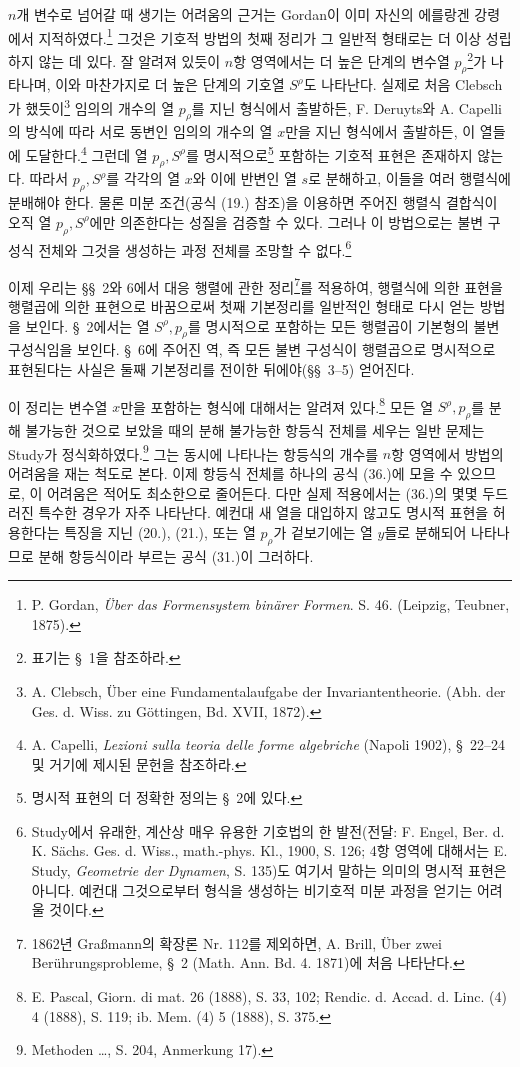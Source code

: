 $n$개 변수로 넘어갈 때 생기는 어려움의 근거는 Gordan이 이미 자신의 에를랑겐 강령에서 지적하였다.\footnote{P. Gordan, \emph{Über das Formensystem binärer Formen}. S. 46. (Leipzig, Teubner, 1875).} 그것은 기호적 방법의 첫째 정리가 그 일반적 형태로는 더 이상 성립하지 않는 데 있다. 잘 알려져 있듯이 $n$항 영역에서는 더 높은 단계의 변수열 $p_\rho$\footnote{표기는 \S\ 1을 참조하라.}가 나타나며, 이와 마찬가지로 더 높은 단계의 기호열 $S^\rho$도 나타난다. 실제로 처음 Clebsch가 했듯이\footnote{A. Clebsch, Über eine Fundamentalaufgabe der Invariantentheorie. (Abh. der Ges. d. Wiss. zu Göttingen, Bd. XVII, 1872).} 임의의 개수의 열 $p_\rho$를 지닌 형식에서 출발하든, F. Deruyts와 A. Capelli의 방식에 따라 서로 동변인 임의의 개수의 열 $x$만을 지닌 형식에서 출발하든, 이 열들에 도달한다.\footnote{A. Capelli, \emph{Lezioni sulla teoria delle forme algebriche} (Napoli 1902), \S\ 22--24 및 거기에 제시된 문헌을 참조하라.} 그런데 열 $p_\rho,S^\rho$를 명시적으로\footnote{명시적 표현의 더 정확한 정의는 \S\ 2에 있다.} 포함하는 기호적 표현은 존재하지 않는다. 따라서 $p_\rho,S^\rho$를 각각의 열 $x$와 이에 반변인 열 $s$로 분해하고, 이들을 여러 행렬식에 분배해야 한다. 물론 미분 조건(공식 (19.) 참조)을 이용하면 주어진 행렬식 결합식이 오직 열 $p_\rho,S^\rho$에만 의존한다는 성질을 검증할 수 있다. 그러나 이 방법으로는 불변 구성식 전체와 그것을 생성하는 과정 전체를 조망할 수 없다.\footnote{Study에서 유래한, 계산상 매우 유용한 기호법의 한 발전(전달: F. Engel, Ber. d. K. Sächs. Ges. d. Wiss., math.-phys. Kl., 1900, S. 126; 4항 영역에 대해서는 E. Study, \emph{Geometrie der Dynamen}, S. 135)도 여기서 말하는 의미의 명시적 표현은 아니다. 예컨대 그것으로부터 형식을 생성하는 비기호적 미분 과정을 얻기는 어려울 것이다.}

이제 우리는 \S\S\ 2와 6에서 \glqq{}대응 행렬에 관한 정리\grqq{}\footnote{1862년 Graßmann의 확장론 Nr. 112를 제외하면, A. Brill, Über zwei Berührungsprobleme, \S\ 2 (Math. Ann. Bd. 4. 1871)에 처음 나타난다.}를 적용하여, 행렬식에 의한 표현을 \glqq{}행렬곱\grqq{}에 의한 표현으로 바꿈으로써 첫째 기본정리를 일반적인 형태로 다시 얻는 방법을 보인다. \S\ 2에서는 열 $S^\rho,p_\rho$를 명시적으로 포함하는 모든 행렬곱이 기본형의 불변 구성식임을 보인다. \S\ 6에 주어진 역, 즉 모든 불변 구성식이 행렬곱으로 명시적으로 표현된다는 사실은 둘째 기본정리를 전이한 뒤에야(\S\S\ 3--5) 얻어진다.

이 정리는 변수열 $x$만을 포함하는 형식에 대해서는 알려져 있다.\footnote{E. Pascal, Giorn. di mat. 26 (1888), S. 33, 102; Rendic. d. Accad. d. Linc. (4) 4 (1888), S. 119; ib. Mem. (4) 5 (1888), S. 375.} 모든 열 $S^\rho,p_\rho$를 분해 불가능한 것으로 보았을 때의 분해 불가능한 항등식 전체를 세우는 일반 문제는 Study가 정식화하였다.\footnote{\glqq{}Methoden \dots\grqq{}, S. 204, Anmerkung 17).} 그는 동시에 나타나는 항등식의 개수를 $n$항 영역에서 방법의 어려움을 재는 척도로 본다. 이제 항등식 전체를 하나의 공식 (36.)에 모을 수 있으므로, 이 어려움은 적어도 최소한으로 줄어든다. 다만 실제 적용에서는 (36.)의 몇몇 두드러진 특수한 경우가 자주 나타난다. 예컨대 새 열을 대입하지 않고도 명시적 표현을 허용한다는 특징을 지닌 (20.), (21.), 또는 열 $p_\rho$가 겉보기에는 열 $y$들로 분해되어 나타나므로 \glqq{}분해 항등식\grqq{}이라 부르는 공식 (31.)이 그러하다.

